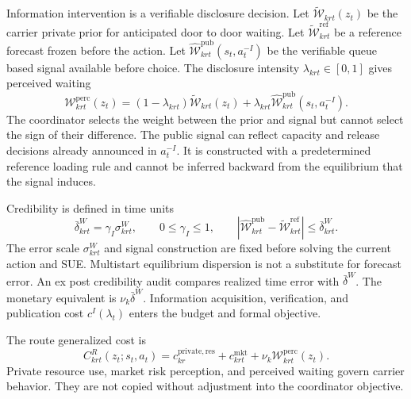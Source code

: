 \documentclass[a4paper,fleqn]{cas-sc}
\begin{document}
Information intervention is a verifiable disclosure decision. Let
$\widetilde{\mathcal W}_{krt}(z_t)$ be the carrier private prior for anticipated
door to door waiting. Let
$\widetilde{\mathcal W}^{\mathrm{ref}}_{krt}$ be a reference forecast frozen
before the action. Let
$\widehat{\mathcal W}^{\mathrm{pub}}_{krt}(s_t,a_t^{-I})$ be the verifiable
queue based signal available before choice. The disclosure intensity
$\lambda_{krt}\in[0,1]$ gives perceived waiting
\begin{equation}
 \mathcal W^{\mathrm{perc}}_{krt}(z_t)=
 (1-\lambda_{krt})\widetilde{\mathcal W}_{krt}(z_t)
 +\lambda_{krt}
 \widehat{\mathcal W}^{\mathrm{pub}}_{krt}(s_t,a_t^{-I}).
 \label{eq:disclosed-wait}
\end{equation}
The coordinator selects the weight between the prior and signal but cannot
select the sign of their difference. The public signal can reflect capacity
and release decisions already announced in $a_t^{-I}$. It is constructed with
a predetermined reference loading rule and cannot be inferred backward from
the equilibrium that the signal induces.

Credibility is defined in time units
\begin{equation}
 \bar\delta^W_{krt}=\gamma_I\sigma^W_{krt},\qquad
 0\le\gamma_I\le1,\qquad
 \left|
 \widehat{\mathcal W}^{\mathrm{pub}}_{krt}
 -\widetilde{\mathcal W}^{\mathrm{ref}}_{krt}
 \right|\le\bar\delta^W_{krt}.
 \label{eq:disclosure-credibility}
\end{equation}
The error scale $\sigma^W_{krt}$ and signal construction are fixed before
solving the current action and SUE. Multistart equilibrium dispersion is not a
substitute for forecast error. An ex post credibility audit compares realized
time error with $\bar\delta^W$. The monetary equivalent is
$\nu_k\bar\delta^W$. Information acquisition, verification, and publication
cost $c^I(\lambda_t)$ enters the budget and formal objective.

The route generalized cost is
\begin{equation}
 C^R_{krt}(z_t;s_t,a_t)=
 c^{\mathrm{private,res}}_{kr}
 +c^{\mathrm{mkt}}_{krt}
 +\nu_k\mathcal W^{\mathrm{perc}}_{krt}(z_t).
 \label{eq:generalized-cost}
\end{equation}
Private resource use, market risk perception, and perceived waiting govern
carrier behavior. They are not copied without adjustment into the coordinator
objective.
\end{document}
